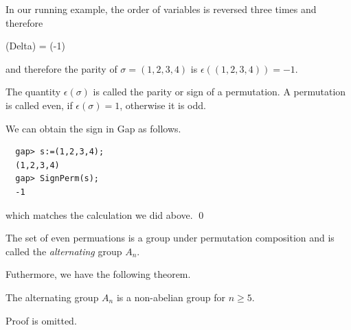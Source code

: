 In our running example, the order of variables is reversed three times and therefore

\bee
\sigma(Delta) = (-1) \Delta
\eee

and therefore the parity of $\sigma = (1,2,3,4)$ is $\epsilon((1,2,3,4)) = -1$.

\begin{definition}
The quantity $\epsilon(\sigma)$ is called the parity or sign of a permutation. A permutation is called even, if $\epsilon(\sigma) = 1$, otherwise it is odd.
\end{definition}

We can obtain the sign in Gap as follows.

\begin{verbatim}
  gap> s:=(1,2,3,4);
  (1,2,3,4)
  gap> SignPerm(s);
  -1
\end{verbatim}

which matches the calculation we did above. \qed

The set of even permuations is a group under permutation composition and is called the \emph{alternating} group $A_n$.

Futhermore, we have the following theorem.

\begin{theorem}
The alternating group $A_n$ is a non-abelian group for $n \geq 5$.
\end{theorem}

Proof is omitted.



